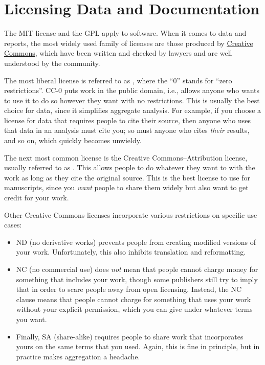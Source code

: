 \section{Licensing Data and Documentation}\label{s:collab-datadocs}

The MIT license and the GPL apply to software.
When it comes to data and reports,
the most widely used family of licenses are those produced by \href{https://creativecommons.org/}{Creative Commons},
which have been written and checked by lawyers and are well understood by the community.

The most liberal license is referred to as ,
where the ``0'' stands for ``zero restrictions''.
CC-0 puts work in the public domain,
i.e.,
allows anyone who wants to use it to do so however they want with no restrictions.
This is usually the best choice for data,
since it simplifies aggregate analysis.
For example,
if you choose a license for data that requires people to cite their source,
then anyone who uses that data in an analysis must cite you;
so must anyone who cites \emph{their} results,
and so on,
which quickly becomes unwieldy.

The next most common license is the Creative Commons--Attribution license,
usually referred to as .
This allows people to do whatever they want to with the work
as long as they cite the original source.
This is the best license to use for manuscripts,
since you \emph{want} people to share them widely
but also want to get credit for your work.

Other Creative Commons licenses incorporate various restrictions on specific use cases:

\begin{itemize}
\item
  ND (no derivative works) prevents people from creating modified versions of your work.
  Unfortunately, this also inhibits translation and reformatting.
\item
  NC (no commercial use) does \emph{not} mean that people cannot charge money for something that includes your work,
  though some publishers still try to imply that in order to scare people away from open licensing.
  Instead,
  the NC clause means that people cannot charge for something that uses your work without your explicit permission,
  which you can give under whatever terms you want.
\item
  Finally,
  SA (share-alike) requires people to share work that incorporates yours
  on the same terms that you used.
  Again,
  this is fine in principle,
  but in practice makes aggregation a headache.
\end{itemize}

